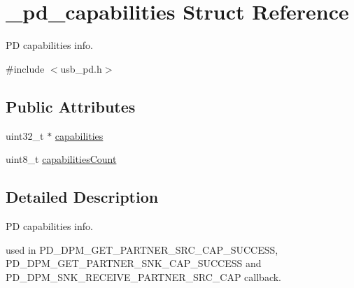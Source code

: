 \hypertarget{struct__pd__capabilities}{\section{\-\_\-pd\-\_\-capabilities Struct Reference}
\label{struct__pd__capabilities}
}


P\-D capabilities info.  




{\ttfamily \#include $<$usb\-\_\-pd.\-h$>$}

\subsection*{Public Attributes}
\begin{DoxyCompactItemize}
\item 
uint32\-\_\-t $\ast$ \hyperlink{struct__pd__capabilities_a559fdae7ddb5376491caf869366e7e71}{capabilities}
\item 
uint8\-\_\-t \hyperlink{struct__pd__capabilities_a240b859a2ffe7e634479a22c3f3e4feb}{capabilities\-Count}
\end{DoxyCompactItemize}


\subsection{Detailed Description}
P\-D capabilities info. 

used in P\-D\-\_\-\-D\-P\-M\-\_\-\-G\-E\-T\-\_\-\-P\-A\-R\-T\-N\-E\-R\-\_\-\-S\-R\-C\-\_\-\-C\-A\-P\-\_\-\-S\-U\-C\-C\-E\-S\-S, P\-D\-\_\-\-D\-P\-M\-\_\-\-G\-E\-T\-\_\-\-P\-A\-R\-T\-N\-E\-R\-\_\-\-S\-N\-K\-\_\-\-C\-A\-P\-\_\-\-S\-U\-C\-C\-E\-S\-S and P\-D\-\_\-\-D\-P\-M\-\_\-\-S\-N\-K\-\_\-\-R\-E\-C\-E\-I\-V\-E\-\_\-\-P\-A\-R\-T\-N\-E\-R\-\_\-\-S\-R\-C\-\_\-\-C\-A\-P callback. 


